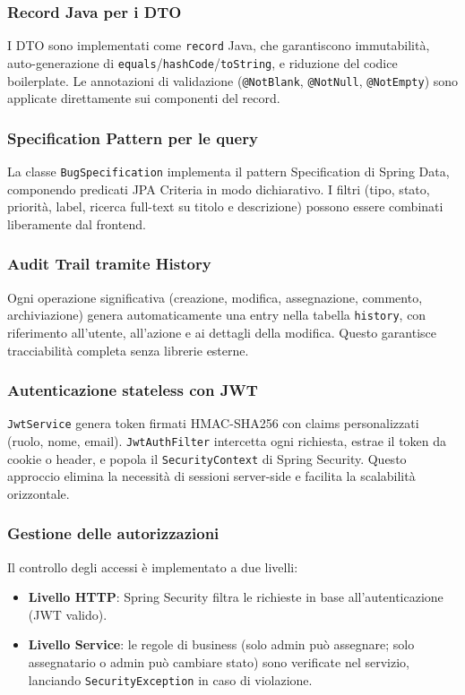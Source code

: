 \subsubsection{Record Java per i DTO}
I DTO sono implementati come \texttt{record} Java, che garantiscono
immutabilità, auto-generazione di \texttt{equals}/\texttt{hashCode}/\texttt{toString},
e riduzione del codice boilerplate. Le annotazioni di validazione
(\texttt{@NotBlank}, \texttt{@NotNull}, \texttt{@NotEmpty}) sono applicate
direttamente sui componenti del record.

\subsubsection{Specification Pattern per le query}
La classe \texttt{BugSpecification} implementa il pattern Specification
di Spring Data, componendo predicati JPA Criteria in modo dichiarativo.
I filtri (tipo, stato, priorità, label, ricerca full-text su titolo e
descrizione) possono essere combinati liberamente dal frontend.

\subsubsection{Audit Trail tramite History}
Ogni operazione significativa (creazione, modifica, assegnazione,
commento, archiviazione) genera automaticamente una entry nella tabella
\texttt{history}, con riferimento all'utente, all'azione e ai dettagli
della modifica. Questo garantisce tracciabilità completa senza librerie esterne.

\subsubsection{Autenticazione stateless con JWT}
\texttt{JwtService} genera token firmati HMAC-SHA256 con claims personalizzati
(ruolo, nome, email). \texttt{JwtAuthFilter} intercetta ogni richiesta,
estrae il token da cookie o header, e popola il \texttt{SecurityContext}
di Spring Security. Questo approccio elimina la necessità di sessioni
server-side e facilita la scalabilità orizzontale.

\subsubsection{Gestione delle autorizzazioni}
Il controllo degli accessi è implementato a due livelli:
\begin{itemize}
    \item \textbf{Livello HTTP}: Spring Security filtra le richieste in base
    all'autenticazione (JWT valido).
    \item \textbf{Livello Service}: le regole di business (solo admin può
    assegnare; solo assegnatario o admin può cambiare stato) sono verificate
    nel servizio, lanciando \texttt{SecurityException} in caso di violazione.
\end{itemize}


